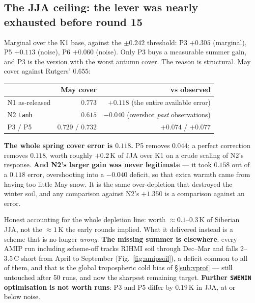 \documentclass[10pt]{article}
\begin{document}
\subsection{The JJA ceiling: the lever was nearly exhausted before round 15}\label{sub:jjaceiling}
Marginal over the K1 base, against the $\pm0.242$ threshold: P3 $+0.305$ (marginal), P5
$+0.113$ (noise), P6 $+0.060$ (noise). Only P3 buys a measurable summer gain, and P3 is the
version with the worst autumn cover. The reason is structural. May cover against Rutgers'
$0.655$:

\begin{center}\footnotesize
\begin{tabular}{l r r}
\toprule
 & May cover & vs observed \\
\midrule
N1 as-released & $0.773$ & $\mathbf{+0.118}$ \quad(the entire available error) \\
N2 \texttt{tanh} & $0.615$ & $\mathbf{-0.040}$ \quad(overshot \emph{past} observations) \\
P3 / P5 & $0.729$ / $0.732$ & $+0.074$ / $+0.077$ \\
\bottomrule
\end{tabular}
\end{center}

\noindent \textbf{The whole spring cover error is $0.118$.} P5 removes $0.044$; a perfect
correction removes $0.118$, worth roughly $+0.2$\,K of JJA over K1 on a crude scaling of N2's
response. \textbf{And N2's larger gain was never legitimate} --- it took $0.158$ out of a
$0.118$ error, overshooting into a $-0.040$ deficit, so that extra warmth came from having too
little May snow. It is the same over-depletion that destroyed the winter soil, and any
comparison against N2's $+1.350$ is a comparison against an error.

Honest accounting for the whole depletion line: worth ${\approx}0.1$--$0.3$\,K of Siberian
JJA, not the ${\approx}1$\,K the early rounds implied. What it delivered instead is a scheme
that is no longer \emph{wrong}. \textbf{The missing summer is elsewhere}: every AMIP run
including scheme-off tracks RIHMI soil through Dec--Mar and falls $2$--$3.5$\,\textdegree C
short from April to September (Fig.~\ref{fig:amipsoil}), a deficit common to all of them, and
that is the global tropospheric cold bias of \S\ref{sub:vprof} --- still untouched after 50
runs, and now the sharpest remaining target. \textbf{Further \texttt{SWEMIN} optimisation is
not worth runs}: P3 and P5 differ by $0.19$\,K in JJA, at or below noise.
\end{document}
